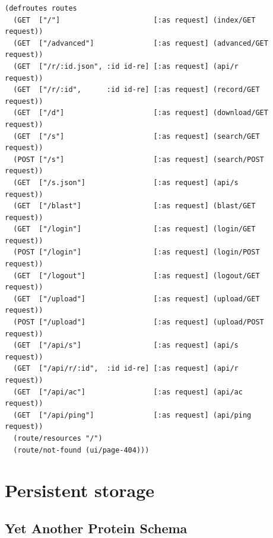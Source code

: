 \lstset{language=Clojure}
\begin{lstlisting}[label=lst:router,caption={%
      [Application ring handler routes]
      Application ring handler routes, taken from \texttt{middleware.clj}.}]
(defroutes routes
  (GET  ["/"]                      [:as request] (index/GET       request))
  (GET  ["/advanced"]              [:as request] (advanced/GET    request))
  (GET  ["/r/:id.json", :id id-re] [:as request] (api/r           request))
  (GET  ["/r/:id",      :id id-re] [:as request] (record/GET      request))
  (GET  ["/d"]                     [:as request] (download/GET    request))
  (GET  ["/s"]                     [:as request] (search/GET      request))
  (POST ["/s"]                     [:as request] (search/POST     request))
  (GET  ["/s.json"]                [:as request] (api/s           request))
  (GET  ["/blast"]                 [:as request] (blast/GET       request))
  (GET  ["/login"]                 [:as request] (login/GET       request))
  (POST ["/login"]                 [:as request] (login/POST      request))
  (GET  ["/logout"]                [:as request] (logout/GET      request))
  (GET  ["/upload"]                [:as request] (upload/GET      request))
  (POST ["/upload"]                [:as request] (upload/POST     request))
  (GET  ["/api/s"]                 [:as request] (api/s           request))
  (GET  ["/api/r/:id",  :id id-re] [:as request] (api/r           request))
  (GET  ["/api/ac"]                [:as request] (api/ac          request))
  (GET  ["/api/ping"]              [:as request] (api/ping        request))
  (route/resources "/")
  (route/not-found (ui/page-404)))
\end{lstlisting}


\section{Persistent storage}\label{sec:persistent-storage}


\subsection{Yet Another Protein Schema}\label{subsec:yaps}


